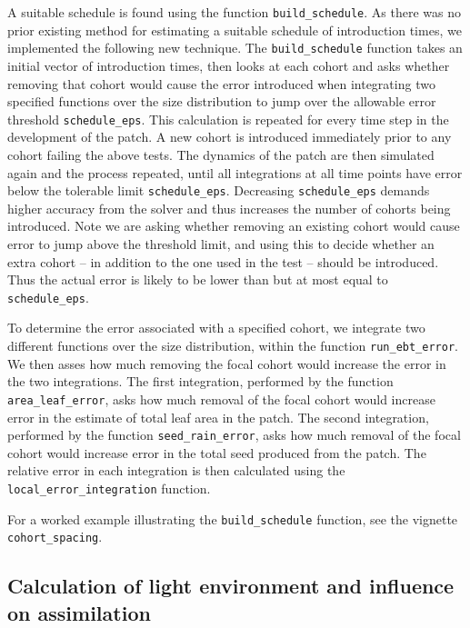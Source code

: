 \documentclass[10pt,twoside]{article}
\begin{document}
A suitable schedule is found using the function
\texttt{build\_schedule}. As there was no prior existing method for
estimating a suitable schedule of introduction times, we implemented the
following new technique. The \texttt{build\_schedule} function takes an
initial vector of introduction times, then looks at each cohort and asks
whether removing that cohort would cause the error introduced when
integrating two specified functions over the size distribution to jump
over the allowable error threshold \texttt{schedule\_eps}. This
calculation is repeated for every time step in the development of the
patch. A new cohort is introduced immediately prior to any cohort
failing the above tests. The dynamics of the patch are
then simulated again and the process repeated, until all integrations at
all time points have error below the tolerable limit
\texttt{schedule\_eps}. Decreasing \texttt{schedule\_eps} demands higher
accuracy from the solver and thus increases the number of cohorts being
introduced. Note we are asking whether removing an existing cohort would
cause error to jump above the threshold limit, and using this to decide
whether an extra cohort -- in addition to the one used in the test --
should be introduced. Thus the actual error is likely to
be lower than but at most equal to \texttt{schedule\_eps}.

To determine the error associated with a specified cohort, we integrate
two different functions over the size distribution, within the function
\texttt{run\_ebt\_error}. We then asses how much removing the focal
cohort would increase the error in the two integrations. The first
integration, performed by the function \texttt{area\_leaf\_error}, asks
how much removal of the focal cohort would increase error in the
estimate of total leaf area in the patch. The second integration,
performed by the function \texttt{seed\_rain\_error}, asks how much
removal of the focal cohort would increase error in the total seed
produced from the patch. The relative error in each integration is then
calculated using the \texttt{local\_error\_integration} function.

For a worked example illustrating the \texttt{build\_schedule} function, 
see the vignette \texttt{cohort\_spacing}.

\subsection{Calculation of light environment and influence on
assimilation}\label{calculation-of-light-environment-and-influence-on-assimilation}
\end{document}
